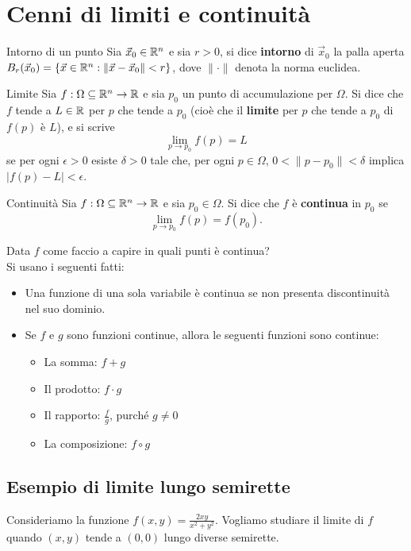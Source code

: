 \section{Cenni di limiti e continuità}

\begin{definizione}{Intorno di un punto}
Sia $\vec x_0 \in \mathbb{R}^n$ e sia $r>0$, si dice \textbf{intorno} di $\vec x_0$ la palla aperta $B_r(\vec x_0)=\{\vec x \in \mathbb{R}^n : \|\vec x - \vec x_0\|<r\}$, dove $\|\cdot\|$ denota la norma euclidea.\\
\end{definizione}

\begin{definizione}{Limite}
Sia $f:\Omega \subseteq \mathbb{R}^n \rightarrow \mathbb{R}$ e sia $p_0$ un punto di accumulazione per $\Omega$. Si dice che $f$ tende a $L \in \mathbb{R}$ per $p$ che tende a $p_0$ (cioè che il \textbf{limite} per $p$ che tende a $p_0$ di $f(p)$ è $L$), e si scrive
$$\lim_{p \to p_0} f(p) = L$$
se per ogni $\epsilon > 0$ esiste $\delta > 0$ tale che, per ogni $p \in \Omega$, $0 < \|p - p_0\| < \delta$ implica $|f(p) - L| < \epsilon$.
\end{definizione}

\begin{definizione}{Continuità}
Sia $f:\Omega \subseteq \mathbb{R}^n \rightarrow \mathbb{R}$ e sia $p_0 \in \Omega$. Si dice che $f$ è \textbf{continua} in $p_0$ se
$$\lim_{p \to p_0} f(p) = f(p_0).$$
\end{definizione}

Data $f$ come faccio a capire in quali punti è continua?\\
Si usano i seguenti fatti:
\begin{itemize}
  \item Una funzione di una sola variabile è continua se non presenta discontinuità nel suo dominio.
  \item Se $f$ e $g$ sono funzioni continue, allora le seguenti funzioni sono continue:
  \begin{itemize}
    \item La somma: $f + g$
    \item Il prodotto: $f \cdot g$
    \item Il rapporto: $\frac{f}{g}$, purché $g \neq 0$
    \item La composizione: $f \circ g$
  \end{itemize}
\end{itemize}

\subsection{Esempio di limite lungo semirette}
Consideriamo la funzione $f(x,y)= \frac{2xy}{x^2+y^2}$. Vogliamo studiare il limite di $f$ quando $(x,y)$ tende a $(0,0)$ lungo diverse semirette.

